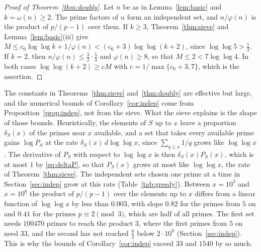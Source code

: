 \documentclass[screen,reqno]{aomart}
\numberwithin{equation}{section}
\theoremstyle{plain}
\theoremstyle{definition}
\theoremstyle{remark}
\begin{document}
\begin{proof}[Proof of Theorem~\ref{thm:doubly}]
Let $n$ be as in Lemma~\ref{lem:basic} and $k=\omega(n)\ge2$. The prime
factors of $n$ form an independent set, and $n/\varphi(n)$ is the
product of $p/(p-1)$ over them. If $k\ge3$, Theorem~\ref{thm:sieve} and
Lemma~\ref{lem:basic}(iii) give
$M\le c_0\log\log k+1/\varphi(n)<(c_0+3)\log\log(k+2)$, since
$\log\log5>\frac13$. If $k=2$, then $n/\varphi(n)\le\frac32\cdot\frac54$
and $\varphi(n)\ge8$, so that $M\le2<7\log\log4$. In both cases
$\log\log(k+2)\ge cM$ with $c=1/\max\{c_0+3,7\}$, which is the
assertion.
\end{proof}

The constants in Theorems~\ref{thm:sieve} and~\ref{thm:doubly} are
effective but large, and the numerical bounds of
Corollary~\ref{cor:indep} come from Proposition~\ref{prop:indep}, not
from the sieve. What the sieve explains is the shape of those bounds.
Heuristically, the elements of $S$ up to $x$ leave a proportion
$\delta_S(x)$ of the primes near $x$ available, and a set that takes
every available prime gains $\log P_S$ at the rate
$\delta_S(x)\,d\log\log x$, since $\sum_{q\le x}1/q$ grows like
$\log\log x$. The derivative of $P_S$ with respect to $\log\log x$ is
then $\delta_S(x)P_S(x)$, which is at most $1$ by \eqref{eq:deltaP},
so that $P_S(x)$ grows at most like $\log\log x$, the rate of
Theorem~\ref{thm:sieve}. The independent sets chosen one prime at a
time in Section~\ref{sec:indep} grow at this rate
(Table~\ref{tab:greedy}). Between $x=10^3$ and $x=10^8$ the product of
$p/(p-1)$ over the elements up to $x$ differs from a linear function of
$\log\log x$ by less than $0.003$, with slope $0.82$ for the primes
from $5$ on and $0.41$ for the primes $p\equiv2\pmod3$, which are
half of all primes. The first set needs $100470$ primes to reach the
product $3$, where the first primes from $5$ on need $33$, and the
second has not reached $\frac83$ below $2\cdot10^8$
(Section~\ref{sec:indep}). This is
why the bounds of Corollary~\ref{cor:indep} exceed $33$ and $1540$ by
so much.
\end{document}

